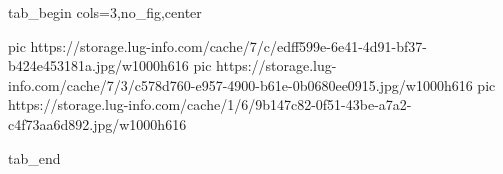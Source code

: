  
 
 
 
 


\ifcmt
  tab_begin cols=3,no_fig,center

     pic https://storage.lug-info.com/cache/7/c/edff599e-6e41-4d91-bf37-b424e453181a.jpg/w1000h616%
		 pic https://storage.lug-info.com/cache/7/3/c578d760-e957-4900-b61e-0b0680ee0915.jpg/w1000h616%
		 pic https://storage.lug-info.com/cache/1/6/9b147c82-0f51-43be-a7a2-c4f73aa6d892.jpg/w1000h616%

  tab_end
\fi
